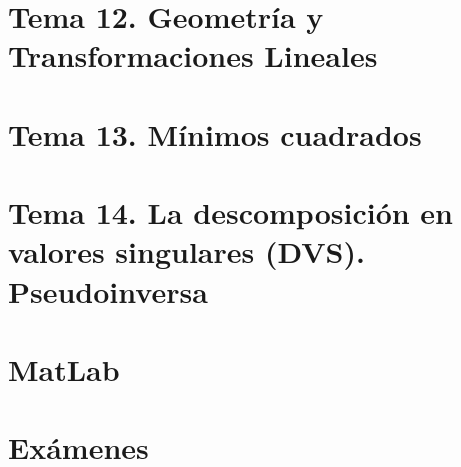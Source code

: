 \documentclass[12pt]{report} %
\begin{document}
\part{Tema 12. Geometría y Transformaciones Lineales}




\part{Tema 13. Mínimos cuadrados}





\part{Tema 14. La descomposición en valores singulares (DVS). Pseudoinversa}





\part{MatLab}




\part{Exámenes}














\end{document}
